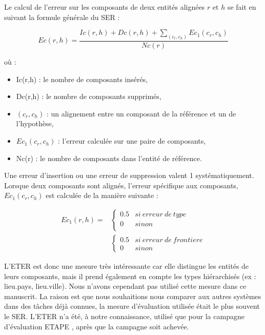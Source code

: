 \documentclass[12pt,a4paper,times,twoside,openright]{report}
\begin{document}
Le calcul de l'erreur sur les composants de deux entités alignées $r$ et $h$ se fait en suivant la formule générale du SER :

\begin{equation}\label{eq:eter-global-component-error}
Ec(r,h) = \frac{Ic(r,h) + Dc(r,h) + \sum_{(c_{r}, c_{h})}Ec_{1}(c_{r}, c_{h})}{Nc(r)}
\end{equation}

où :
\begin{itemize}
    \item Ic(r,h) : le nombre de composants insérés,
    \item Dc(r,h) : le nombre de composants supprimés,
    \item $(c_{r}, c_{h})$ : un alignement entre un composant de la référence et un de l'hypothèse,
    \item $Ec_{1}(c_{r}, c_{h})$ : l'erreur calculée sur une paire de composants,
    \item Nc(r) : le nombre de composants dans l'entité de référence.
\end{itemize}

Une erreur d'insertion ou une erreur de suppression valent 1 systématiquement. Lorsque deux composants sont alignés, l'erreur spécifique aux composants, $Ec_{1}(c_{r}, c_{h})$ est calculée de la manière suivante :

\begin{equation}\label{eq:eter-component-error}
\begin{aligned}
Ec_{1}(r,h) = & \left\{ \begin{array}{ll}
            0.5 & si\ erreur\ de\ type \\
            0   & sinon \\
            \end{array} \right. \\
          & \left\{ \begin{array}{ll}
            0.5 & si\ erreur\ de\ frontiere \\
            0   & sinon
            \end{array} \right.
\end{aligned}
\end{equation}

L'ETER est donc une mesure très intéressante car elle distingue les entités de leurs composants, mais il prend également en compte les types hiérarchisés (ex : lieu.pays, lieu.ville). Nous n'avons cependant pas utilisé cette mesure dans ce manuscrit. La raison est que nous souhaitions nous comparer aux autres systèmes dans des tâches déjà connues, la mesure d'évaluation utilisée était le plus souvent le SER. L'ETER n'a été, à notre connaissance, utilisé que pour la campagne d'évaluation ETAPE \citep{gravier2012etape}, après que la campagne soit achevée.
\end{document}

